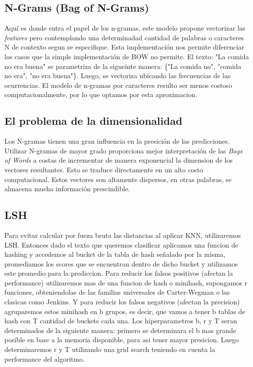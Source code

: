 \documentclass[a4paper,10pt]{article}
\begin{document}
	\subsection{N-Grams (Bag of N-Grams)}
	Aqu\'{i} es donde entra el papel de los n-gramas, este modelo propone vectorizar las \textit{features} pero contemplando una determinadad cantidad de palabras o caracteres N de contexto segun se especifique. Esta implementaci\'{o}n nos permite diferenciar los casos que la simple implementaci\'{o}n de BOW no permite.
	El texto: "La comida no era buena" se parametriza de la sigueinte manera: \{"La comida no", "comida no era", "no era buena"\}. Luego, se vectoriza ubicando las frecuencias de las ocurrencias. El modelo de n-gramas por caracteres resulto ser menos costoso computacionalmente, por lo que optamos por esta aproximacion.
	
	\subsection{El problema de la dimensionalidad}
	Los N-gramas tienen una gran influencia en la presici\'{o}n de las predicciones. Utilizar N-gramas de mayor grado proporciona mejor interpretaci\'{o}n de las \textit{Bags of Words} a costas de incrementar de manera exponencial la dimension de los vectores resultantes. Esto se traduce directamente en un alto costo computacional. Estos vectores son altamente dispersos, en otras palabras, se almacena mucha informaci\'{o}n prescindible.

	
	\subsection{LSH}
	
	Para evitar calcular por fueza bruta las distancias al aplicar KNN, utilizaremos LSH. Entonces dado el texto que queremos clasificar aplicamos una funcion de hashing y accedemos al bucket de la tabla de hash se\~{n}alado por la misma, promediamos los scores que se encuentran dentro de dicho bucket y utilizamos este promedio para la prediccion. Para reducir los falsos positivos (afectan la performance) utilizaremos mas de una funcion de hash o minihash, supongamos r funciones, obteniendolas de las familias universales de Carter-Wegman o las clasicas como Jenkins. Y para reducir los falsos negativos (afectan la precision) agruparemos estos minihash en b grupos, es decir, que vamos a tener b tablas de hash con T cantidad de buckets cada una.
	 Los hiperparametros b, r y T seran determinados de la siguiente manera: primero se determinara el b mas grande posible en base a la memoria disponible, para asi tener mayor presicion. Luego determinaremos r y T utilizando una grid search teniendo en cuenta la performance del algoritmo.
\end{document}
